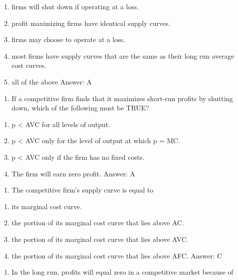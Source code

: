 \documentclass[11pt,]{article}
\providecommand{\tightlist}{%
  \setlength{\itemsep}{0pt}\setlength{\parskip}{0pt}}
\begin{document}
\begin{enumerate}
\def\labelenumi{\Alph{enumi})}
\tightlist
\item
  firms will shut down if operating at a loss.
\item
  profit maximizing firms have identical supply curves.
\item
  firms may choose to operate at a loss.
\item
  most firms have supply curves that are the same as their long run
  average cost curves.
\item
  all of the above Answer: A
\end{enumerate}

\begin{enumerate}
\def\labelenumi{\arabic{enumi})}
\setcounter{enumi}{16}
\tightlist
\item
  If a competitive firm finds that it maximizes short-run profits by
  shutting down, which of the following must be TRUE?
\end{enumerate}

\begin{enumerate}
\def\labelenumi{\Alph{enumi})}
\tightlist
\item
  p \textless{} AVC for all levels of output.
\item
  p \textless{} AVC only for the level of output at which p = MC.
\item
  p \textless{} AVC only if the firm has no fixed costs.
\item
  The firm will earn zero profit. Answer: A
\end{enumerate}

\begin{enumerate}
\def\labelenumi{\arabic{enumi})}
\setcounter{enumi}{17}
\tightlist
\item
  The competitive firm's supply curve is equal to
\end{enumerate}

\begin{enumerate}
\def\labelenumi{\Alph{enumi})}
\tightlist
\item
  its marginal cost curve.
\item
  the portion of its marginal cost curve that lies above AC.
\item
  the portion of its marginal cost curve that lies above AVC.
\item
  the portion of its marginal cost curve that lies above AFC. Answer: C
\end{enumerate}

\begin{enumerate}
\def\labelenumi{\arabic{enumi})}
\setcounter{enumi}{18}
\tightlist
\item
  In the long run, profits will equal zero in a competitive market
  because of
\end{enumerate}
\end{document}
